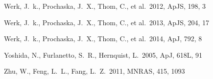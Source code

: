 \documentclass[useAMS,usenatbib]{mn2e}
\def \apj {ApJ}
\def \mnras {MNRAS}
\def \apjs {ApJS}
\begin{document}
\begin{thebibliography}{}
 Werk, J.~k., Prochaska, J.~X., Thom, C., et al.\ 2012, \apjs, 198, 3

 Werk, J.~k., Prochaska, J.~X., Thom, C., et al.\ 2013, \apjs, 204, 17

 Werk, J.~k., Prochaska, J.~X., Thom, C., et al.\ 2014, \apj, 792, 8



Yoshida, N., Furlanetto, S.~R., Hernquist, L.\ 2005, \apj, 618L, 91


 Zhu, W., Feng, L.~L., Fang, L.~Z.\ 2011, \mnras, 415, 1093

\end{thebibliography}

\label{lastpage}
\end{document}
